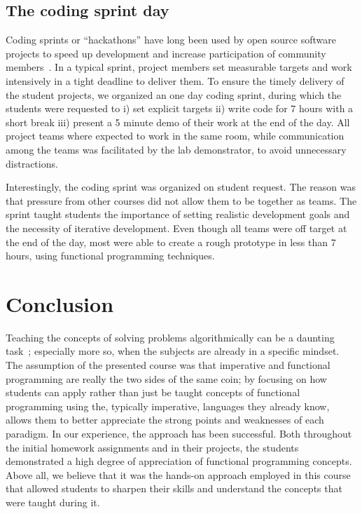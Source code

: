 \documentclass[conference]{IEEEtran}
\begin{document}
\subsection{The coding sprint day}

Coding sprints or ``hackathons'' have long been used by open source software
projects to speed up development and increase participation of community
members~\cite{Adams11}. In a typical sprint, project members set measurable
targets and work intensively in a tight deadline to deliver them. To ensure the
timely delivery of the student projects, we organized an one day coding sprint,
during which the students were requested to i) set explicit targets ii) write
code for 7 hours with a short break iii) present a 5 minute demo of their work
at the end of the day. All project teams where expected to work in the same
room, while communication among the teams was facilitated by the lab
demonstrator, to avoid unnecessary distractions.

Interestingly, the coding sprint was organized on student request. The reason
was that pressure from other courses did not allow them to be together as teams.
The sprint taught students the importance of setting realistic development goals
and the necessity of iterative development. Even though all teams were off
target at the end of the day, most were able to create a rough prototype in less
than 7 hours, using functional programming techniques. 

%
%
\section{Conclusion}

Teaching the concepts of solving problems algorithmically can be a daunting
task~\cite{Futsc06}; especially more so, when the subjects are already in a
specific mindset. The assumption of the presented course was that imperative and
functional programming are really the two sides of the same coin; by focusing on
how students can apply rather than just be taught concepts of functional
programming using the, typically imperative, languages they already know, allows
them to better appreciate the strong points and weaknesses of each paradigm. In
our experience, the approach has been successful. Both throughout the initial
homework assignments and in their projects, the students demonstrated a high
degree of appreciation of functional programming concepts. Above all, we
believe that it was the hands-on approach 
employed in this course that allowed students to sharpen their skills and
understand the concepts that were taught during it.
\end{document}
